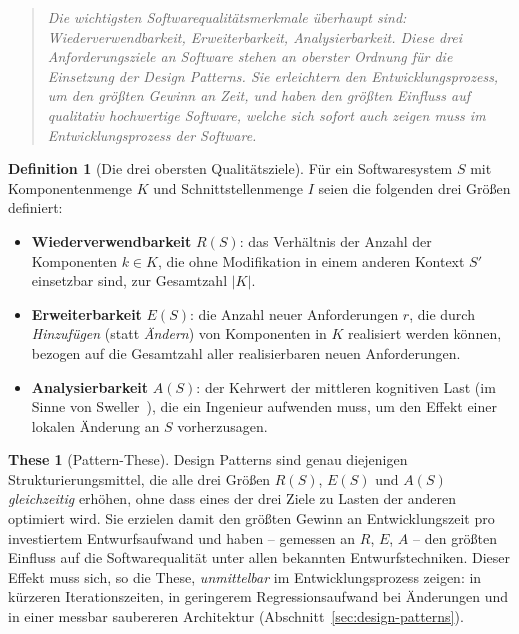 ﻿\documentclass[a4paper,12pt]{report}
\theoremstyle{definition}
\newtheorem{definition}{Definition}[section]
\newtheorem{these}{These}[section]
\begin{document}
\begin{quotation}
\noindent\textit{%
Die wichtigsten Softwarequalitätsmerkmale überhaupt sind: Wiederverwendbarkeit,
Erweiterbarkeit, Analysierbarkeit. Diese drei Anforderungsziele an Software stehen
an oberster Ordnung für die Einsetzung der Design Patterns. Sie erleichtern den
Entwicklungsprozess, um den größten Gewinn an Zeit, und haben den größten Einfluss
auf qualitativ hochwertige Software, welche sich sofort auch zeigen muss im
Entwicklungsprozess der Software.
}
\end{quotation}

\begin{definition}[Die drei obersten Qualitätsziele]
\label{def:qualitaetsziele}
Für ein Softwaresystem $S$ mit Komponentenmenge $K$ und Schnittstellenmenge $I$
seien die folgenden drei Größen definiert:
\begin{itemize}
  \item \textbf{Wiederverwendbarkeit} $R(S)$: das Verhältnis der Anzahl der
  Komponenten $k \in K$, die ohne Modifikation in einem anderen Kontext $S'$
  einsetzbar sind, zur Gesamtzahl $|K|$.
  \item \textbf{Erweiterbarkeit} $E(S)$: die Anzahl neuer Anforderungen $r$, die
  durch \emph{Hinzufügen} (statt \emph{Ändern}) von Komponenten in $K$ realisiert
  werden können, bezogen auf die Gesamtzahl aller realisierbaren neuen
  Anforderungen.
  \item \textbf{Analysierbarkeit} $A(S)$: der Kehrwert der mittleren kognitiven
  Last (im Sinne von Sweller~\cite{sweller1988}), die ein Ingenieur aufwenden
  muss, um den Effekt einer lokalen Änderung an $S$ vorherzusagen.
\end{itemize}
\end{definition}

\begin{these}[Pattern-These]
\label{these:patterns}
Design Patterns sind genau diejenigen Strukturierungsmittel, die alle drei
Größen $R(S)$, $E(S)$ und $A(S)$ \emph{gleichzeitig} erhöhen, ohne dass eines
der drei Ziele zu Lasten der anderen optimiert wird. Sie erzielen damit den
größten Gewinn an Entwicklungszeit pro investiertem Entwurfsaufwand und haben
-- gemessen an $R$, $E$, $A$ -- den größten Einfluss auf die Softwarequalität
unter allen bekannten Entwurfstechniken. Dieser Effekt muss sich, so die These,
\emph{unmittelbar} im Entwicklungsprozess zeigen: in kürzeren Iterationszeiten,
in geringerem Regressionsaufwand bei Änderungen und in einer messbar saubereren
Architektur (Abschnitt~\ref{sec:design-patterns}).
\end{these}
\end{document}

